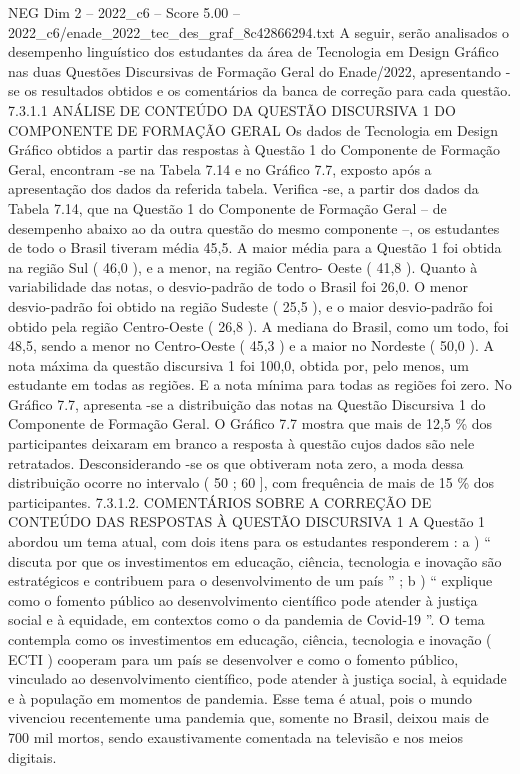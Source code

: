 \begin{textsample}{NEG Dim 2 – 2022\_c6 – Score 5.00 – 2022\_c6/enade\_2022\_tec\_des\_graf\_8c42866294.txt}
A seguir, serão analisados o desempenho linguístico dos estudantes da área de Tecnologia em Design Gráfico nas duas Questões Discursivas de Formação Geral do Enade/2022, apresentando -se os resultados obtidos e os comentários da banca de correção para cada questão. 7.3.1.1 ANÁLISE DE CONTEÚDO DA QUESTÃO DISCURSIVA 1 DO COMPONENTE DE FORMAÇÃO GERAL Os dados de Tecnologia em Design Gráfico obtidos a partir das respostas à Questão 1 do Componente de Formação Geral, encontram -se na Tabela 7.14 e no Gráfico 7.7, exposto após a apresentação dos dados da referida tabela.
Verifica -se, a partir dos dados da Tabela 7.14, que na Questão 1 do Componente de Formação Geral – de desempenho abaixo ao da outra questão do mesmo componente –, os estudantes de todo o Brasil tiveram média 45,5.
A maior média para a Questão 1 foi obtida na região Sul ( 46,0 ), e a menor, na região Centro- Oeste ( 41,8 ).
Quanto à variabilidade das notas, o desvio-padrão de todo o Brasil foi 26,0.
O menor desvio-padrão foi obtido na região Sudeste ( 25,5 ), e o maior desvio-padrão foi obtido pela região Centro-Oeste ( 26,8 ).
A mediana do Brasil, como um todo, foi 48,5, sendo a menor no Centro-Oeste ( 45,3 ) e a maior no Nordeste ( 50,0 ).
A nota máxima da questão discursiva 1 foi 100,0, obtida por, pelo menos, um estudante em todas as regiões.
E a nota mínima para todas as regiões foi zero.
No Gráfico 7.7, apresenta -se a distribuição das notas na Questão Discursiva 1 do Componente de Formação Geral.
O Gráfico 7.7 mostra que mais de 12,5 \% dos participantes deixaram em branco a resposta à questão cujos dados são nele retratados.
Desconsiderando -se os que obtiveram nota zero, a moda dessa distribuição ocorre no intervalo ( 50 ; 60 ], com frequência de mais de 15 \% dos participantes. 7.3.1.2.
COMENTÁRIOS SOBRE A CORREÇÃO DE CONTEÚDO DAS RESPOSTAS À QUESTÃO DISCURSIVA 1 A Questão 1 abordou um tema atual, com dois itens para os estudantes responderem : a ) “ discuta por que os investimentos em educação, ciência, tecnologia e inovação são estratégicos e contribuem para o desenvolvimento de um país ” ; b ) “ explique como o fomento público ao desenvolvimento científico pode atender à justiça social e à equidade, em contextos como o da pandemia de Covid-19 ”.
O tema contempla como os investimentos em educação, ciência, tecnologia e inovação ( ECTI ) cooperam para um país se desenvolver e como o fomento público, vinculado ao desenvolvimento científico, pode atender à justiça social, à equidade e à população em momentos de pandemia.
Esse tema é atual, pois o mundo vivenciou recentemente uma pandemia que, somente no Brasil, deixou mais de 700 mil mortos, sendo exaustivamente comentada na televisão e nos meios digitais.

\end{textsample}
